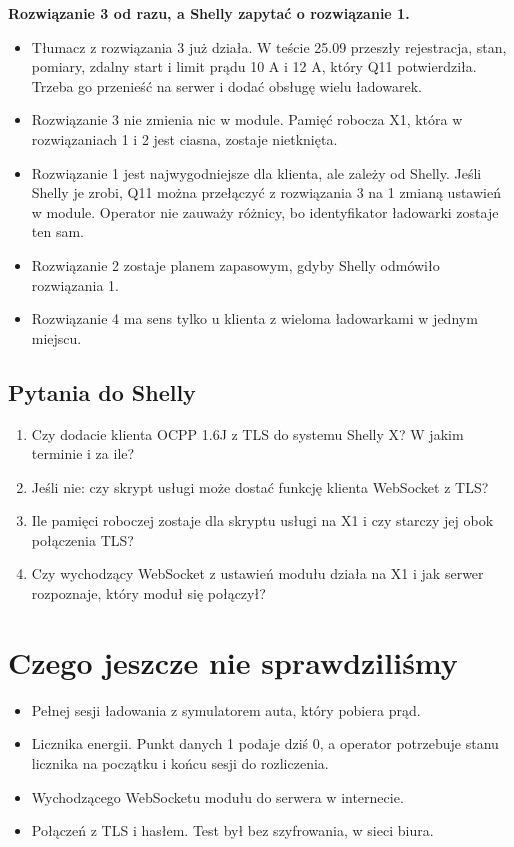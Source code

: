 \documentclass[11pt,a4paper]{article}
\begin{document}
\textbf{Rozwiązanie 3 od razu, a Shelly zapytać o rozwiązanie 1.}


\begin{itemize}
\item Tłumacz z rozwiązania 3 już działa. W teście 25.09 przeszły rejestracja, stan, pomiary, zdalny start i limit prądu 10 A i 12 A, który Q11 potwierdziła. Trzeba go przenieść na serwer i dodać obsługę wielu ładowarek.
\item Rozwiązanie 3 nie zmienia nic w module. Pamięć robocza X1, która w rozwiązaniach 1 i 2 jest ciasna, zostaje nietknięta.
\item Rozwiązanie 1 jest najwygodniejsze dla klienta, ale zależy od Shelly. Jeśli Shelly je zrobi, Q11 można przełączyć z rozwiązania 3 na 1 zmianą ustawień w module. Operator nie zauważy różnicy, bo identyfikator ładowarki zostaje ten sam.
\item Rozwiązanie 2 zostaje planem zapasowym, gdyby Shelly odmówiło rozwiązania 1.
\item Rozwiązanie 4 ma sens tylko u klienta z wieloma ładowarkami w jednym miejscu.
\end{itemize}

\subsection{Pytania do Shelly}

\begin{enumerate}
\item Czy dodacie klienta OCPP 1.6J z TLS do systemu Shelly X? W jakim terminie i za ile?
\item Jeśli nie: czy skrypt usługi może dostać funkcję klienta WebSocket z TLS?
\item Ile pamięci roboczej zostaje dla skryptu usługi na X1 i czy starczy jej obok połączenia TLS?
\item Czy wychodzący WebSocket z ustawień modułu działa na X1 i jak serwer rozpoznaje, który moduł się połączył?
\end{enumerate}

\section{Czego jeszcze nie sprawdziliśmy}

\begin{itemize}
\item Pełnej sesji ładowania z symulatorem auta, który pobiera prąd.
\item Licznika energii. Punkt danych 1 podaje dziś 0, a operator potrzebuje stanu licznika na początku i końcu sesji do rozliczenia.
\item Wychodzącego WebSocketu modułu do serwera w internecie.
\item Połączeń z TLS i hasłem. Test był bez szyfrowania, w sieci biura.
\end{itemize}
\end{document}
